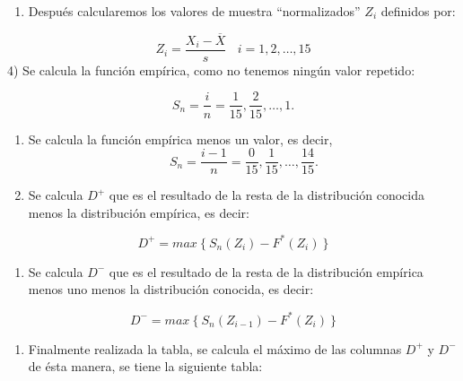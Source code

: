\documentclass[
  a4paper,
  oneside,
  openany]{book}
\providecommand{\tightlist}{%
  \setlength{\itemsep}{0pt}\setlength{\parskip}{0pt}}
\begin{document}
\begin{enumerate}
\def\labelenumi{\arabic{enumi})}
\setcounter{enumi}{2}
\tightlist
\item
  Después calcularemos los valores de muestra ``normalizados'' \(Z_{i}\) definidos por:
\end{enumerate}

\[Z_{i}=\frac{X_{i}-\overline{X}}{s} \ \ \ \ i=1,2,\ldots,15\]
4) Se calcula la función empírica, como no tenemos ningún valor repetido:

\[S_{n}= \frac{i}{n}=\frac{1}{15},\frac{2}{15}, \ldots, 1. \]

\begin{enumerate}
\def\labelenumi{\arabic{enumi})}
\setcounter{enumi}{4}
\item
  Se calcula la función empírica menos un valor, es decir,
  \[S_{n}= \frac{i-1}{n}=\frac{0}{15},\frac{1}{15}, \ldots, \frac{14}{15}.\]
\item
  Se calcula \(D^+\) que es el resultado de la resta de la distribución conocida menos la distribución empírica, es decir:
\end{enumerate}

\[D^+= max\ \{ \ S_{n}(Z_{i})-F^*(Z_{i}) \ \}\]

\begin{enumerate}
\def\labelenumi{\arabic{enumi})}
\setcounter{enumi}{6}
\tightlist
\item
  Se calcula \(D^-\) que es el resultado de la resta de la distribución empírica menos uno menos la distribución conocida, es decir:
\end{enumerate}

\[D^-= max\ \{\ S_{n}(Z_{i-1})-F^*(Z_{i}) \ \}\]

\begin{enumerate}
\def\labelenumi{\arabic{enumi})}
\setcounter{enumi}{7}
\tightlist
\item
  Finalmente realizada la tabla, se calcula el máximo de las columnas \(D^+\) y \(D^-\) de ésta manera, se tiene la siguiente tabla:
\end{enumerate}
\end{document}
